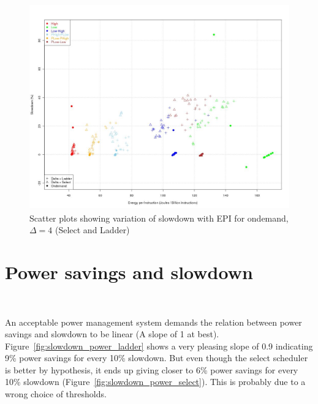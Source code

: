 \begin{figure}[h!]
  \begin{center}
    \includegraphics[height=3.5in]{figures/jpbi_vs_slowdown_delta_4.jpg}%
    \caption{Scatter plots showing variation of slowdown with EPI for ondemand, $\Delta=4$ (Select and Ladder)}
    \label{fig:jpbi_vs_slowdown}
  \end{center}
\end{figure}

\section{Power savings and slowdown}~\label{sec:pow_slow}

An acceptable power management system demands the relation between power savings and slowdown to be linear
(A slope of 1 at best). Figure~\ref{fig:slowdown_power_ladder} shows a very pleasing slope of 0.9 indicating 
9\% power savings for every 10\% slowdown. 
But even though the select scheduler is better by hypothesis, it ends up giving closer to 6\% power savings
for every 10\% slowdown (Figure~\ref{fig:slowdown_power_select}). This is probably due to a wrong choice of thresholds. 


